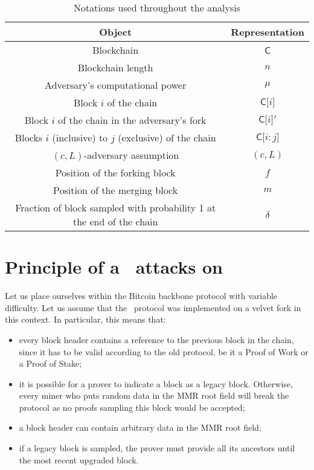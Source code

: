       \begin{table}[ht]
        \centering
        \begin{tabular}{|c|c|}
          \hline
          Object & Representation\\
          \hline
          Blockchain & \(\mathsf{C}\)\\
          \hline
          Blockchain length &  \(n\)\\
          \hline
          Adversary's computational power &  \(\mu\)\\
          \hline
          Block  \(i\) of the chain &  \(\mathsf{C[}i\mathsf{]}\)\\
          \hline
          Block \(i\) of the chain in the adversary's fork & \(\mathsf{C[}i\mathsf{]}'\)\\
          \hline
          Blocks \(i\) (inclusive) to  \(j\) (exclusive) of the chain &  \(\mathsf{C[}i\mathsf{:}j\mathsf{]}\)\\
          \hline
          \((c,L)\)-adversary assumption &  \((c,L)\)\\
          \hline
          Position of the forking block & \(f\)\\
          \hline
          Position of the merging block &  \(m\)\\
          \hline
          Fraction of block sampled with probability 1 at the end of the chain & \(\delta\)\\
          \hline
        \end{tabular}
        \caption{Notations used throughout the analysis}
        \label{table:notations}
      \end{table} 
    
    \printglossary[type=notationschainsewing]
      
    \section{Principle of a \cs\ attacks on \FC}
      \label{section:attack}
      Let us place ourselves within the Bitcoin backbone protocol with variable difficulty. Let us assume that the \FC\ protocol was implemented on a velvet fork in this context. In particular, this means that:

      \begin{itemize}
        \item every block header contains a reference to the previous block in the chain, since it has to be valid according to the old protocol, be it a Proof of Work or a Proof of Stake;
        \item it is possible for a prover to indicate a block as a legacy block. Otherwise, every miner who puts random data in the MMR root field will break the protocol as no proofs sampling this block would be accepted;
        \item a block header can contain arbitrary data in the MMR root field;
        \item if a legacy block is sampled, the prover must provide all its ancestors until the most recent upgraded block.
      \end{itemize}
      
